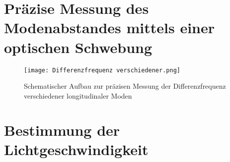 \chapter{ Präzise Messung des Modenabstandes mittels einer
optischen Schwebung}


 \begin{figure}[htbp]
    \centering
    \texttt{[image: Differenzfrequenz verschiedener.png]}
     \caption{Schematischer Aufbau zur präzisen Messung der Differenzfrequenz verschiedener longitudinaler Moden \cite{praktikum}}
    \label{fig:difffreq}
  \end{figure}
 
\chapter{Bestimmung der Lichtgeschwindigkeit}